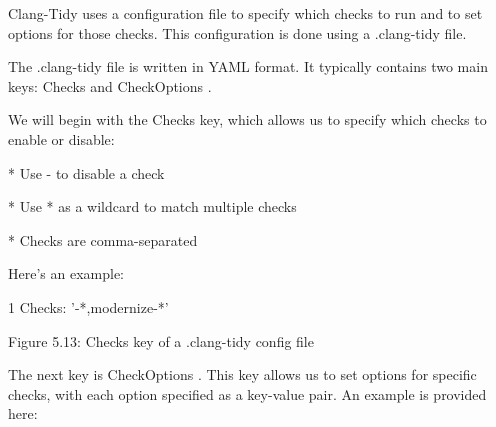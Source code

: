 \begin{markdown}

Clang-Tidy uses a configuration file to specify which checks to run and to set options for those checks. This configuration is done using a .clang-tidy file.

The .clang-tidy file is written in YAML format. It typically contains two main keys: Checks and CheckOptions .

We will begin with the Checks key, which allows us to specify which checks to enable or disable:

* Use - to disable a check

* Use * as a wildcard to match multiple checks

* Checks are comma-separated

Here’s an example:

\begin{shell}
1  Checks: ’-*,modernize-*’
\end{shell}

\begin{center}
Figure 5.13: Checks key of a .clang-tidy config file
\end{center}

The next key is CheckOptions . This key allows us to set options for specific checks, with each option specified as a key-value pair. An example is provided here:

\end{markdown}



























